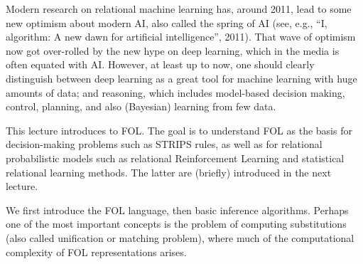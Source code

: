 {Modern research on relational machine learning has, around 2011, lead
to some new optimism about modern AI, also called the spring of AI
(see, e.g., ``I, algorithm: A new dawn for artificial intelligence'',
2011). That wave of optimism now got over-rolled by the new hype on
deep learning, which in the media is often equated with AI. However,
at least up to now, one should clearly distinguish between deep
learning as a great tool for machine learning with huge amounts of
data; and reasoning, which includes model-based decision making,
control, planning, and also (Bayesian) learning from few data.

This lecture introduces to FOL. The goal is to understand FOL as the
basis for decision-making problems such as STRIPS rules, as well as
for relational probabilistic models such as relational Reinforcement
Learning and statistical relational learning methods. The latter are
(briefly) introduced in the next lecture.

We first introduce the FOL language, then basic inference
algorithms. Perhaps one of the most important concepts is the problem
of computing substitutions (also called unification or matching
problem), where much of the computational complexity of FOL
representations arises.

}





